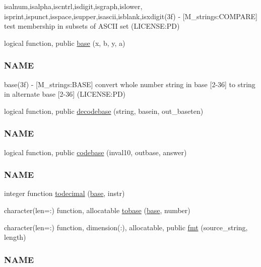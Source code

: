\begin{DoxyCompactItemize}
\begin{DoxyCompactList}
isalnum,isalpha,iscntrl,isdigit,isgraph,islower, isprint,ispunct,isspace,isupper,isascii,isblank,isxdigit(3f) -\/ \mbox{[}M\+\_\+strings\+:C\+O\+M\+P\+A\+RE\mbox{]} test membership in subsets of A\+S\+C\+II set (L\+I\+C\+E\+N\+SE\+:PD) \end{DoxyCompactList}\item 
logical function, public \mbox{\hyperlink{namespacem__strings_a635ef6f1dd73400e7b339392886d6357}{base}} (x, b, y, a)
\begin{DoxyCompactList}\small\item\em \subsubsection*{N\+A\+ME}

base(3f) -\/ \mbox{[}M\+\_\+strings\+:B\+A\+SE\mbox{]} convert whole number string in base \mbox{[}2-\/36\mbox{]} to string in alternate base \mbox{[}2-\/36\mbox{]} (L\+I\+C\+E\+N\+SE\+:PD) \end{DoxyCompactList}\item 
logical function, public \mbox{\hyperlink{namespacem__strings_a3883dae1b85c2d4a09d2d7e46ff422ab}{decodebase}} (string, basein, out\+\_\+baseten)
\begin{DoxyCompactList}\small\item\em \subsubsection*{N\+A\+ME}\end{DoxyCompactList}\item 
logical function, public \mbox{\hyperlink{namespacem__strings_a3a022b64dc902dc6043e3f265ee78e38}{codebase}} (inval10, outbase, answer)
\begin{DoxyCompactList}\small\item\em \subsubsection*{N\+A\+ME}\end{DoxyCompactList}\item 
integer function \mbox{\hyperlink{namespacem__strings_aded6e43ae13ff21d76c1739f01a40a63}{todecimal}} (\mbox{\hyperlink{namespacem__strings_a635ef6f1dd73400e7b339392886d6357}{base}}, instr)
\item 
character(len=\+:) function, allocatable \mbox{\hyperlink{namespacem__strings_aa896d221112afb3dbc90eeca6075b282}{tobase}} (\mbox{\hyperlink{namespacem__strings_a635ef6f1dd73400e7b339392886d6357}{base}}, number)
\item 
character(len=\+:) function, dimension(\+:), allocatable, public \mbox{\hyperlink{namespacem__strings_afccf1e453a4315a639f133f2f7c0078b}{fmt}} (source\+\_\+string, length)
\begin{DoxyCompactList}\small\item\em \subsubsection*{N\+A\+ME}


\end{DoxyCompactList}
\end{DoxyCompactItemize}
